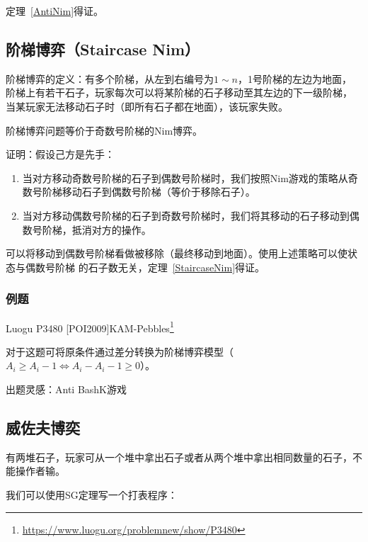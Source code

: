 定理~\ref{AntiNim}得证。

\subsection{阶梯博弈（Staircase Nim）}
阶梯博弈的定义：有多个阶梯，从左到右编号为$1\sim n$，1号阶梯的左边为地面，
阶梯上有若干石子，玩家每次可以将某阶梯的石子移动至其左边的下一级阶梯，
当某玩家无法移动石子时（即所有石子都在地面），该玩家失败。

\begin{theorem}\label{StaircaseNim}
	阶梯博弈问题等价于奇数号阶梯的Nim博弈。
\end{theorem}

证明：假设己方是先手：

\begin{enumerate}
	\item 当对方移动奇数号阶梯的石子到偶数号阶梯时，我们按照Nim游戏的策略从奇
	      数号阶梯移动石子到偶数号阶梯（等价于移除石子）。
	\item 当对方移动偶数号阶梯的石子到奇数号阶梯时，我们将其移动的石子移动到偶
	      数号阶梯，抵消对方的操作。
\end{enumerate}

可以将移动到偶数号阶梯看做被移除（最终移动到地面）。使用上述策略可以使状态与偶数号阶梯
的石子数无关，定理~\ref{StaircaseNim}得证。

\subsubsection{例题}

Luogu P3480 [POI2009]KAM-Pebbles\footnote{\url{https://www.luogu.org/problemnew/show/P3480}}

对于这题可将原条件通过差分转换为阶梯博弈模型（$A_i \geq A_i-1 \Leftrightarrow
	A_i-A_i-1 \geq 0$）。



出题灵感：Anti BashK游戏

\subsection{威佐夫博奕}
有两堆石子，玩家可从一个堆中拿出石子或者从两个堆中拿出相同数量的石子，不能操作者输。

我们可以使用SG定理写一个打表程序：


